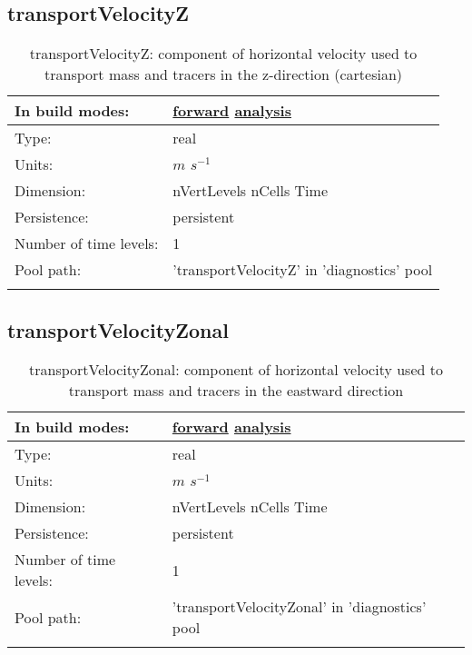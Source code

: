 \subsection[transportVelocityZ]{transportVelocityZ}
\label{subsec:var_sec_diagnostics_transportVelocityZ}
\begin{center}
\begin{longtable}{| p{2.0in} | p{4.0in} |}
        \hline 
        In build modes: & \hyperref[subsec:forward_var_tab_diagnostics]{forward} \hyperref[subsec:analysis_var_tab_diagnostics]{analysis} \\
        \hline 
        Type: & real \\
        \hline 
        Units: & $m$ $s^{-1}$ \\
        \hline 
        Dimension: & nVertLevels nCells Time \\
        \hline 
        Persistence: & persistent \\
        \hline 
        Number of time levels: & 1 \\
        \hline 
            Pool path: & 'transportVelocityZ' in 'diagnostics' pool
 \\
		 \hline 
    \caption{transportVelocityZ: component of horizontal velocity used to transport mass and tracers in the z-direction (cartesian)}
\end{longtable}
\end{center}
\subsection[transportVelocityZonal]{transportVelocityZonal}
\label{subsec:var_sec_diagnostics_transportVelocityZonal}
\begin{center}
\begin{longtable}{| p{2.0in} | p{4.0in} |}
        \hline 
        In build modes: & \hyperref[subsec:forward_var_tab_diagnostics]{forward} \hyperref[subsec:analysis_var_tab_diagnostics]{analysis} \\
        \hline 
        Type: & real \\
        \hline 
        Units: & $m$ $s^{-1}$ \\
        \hline 
        Dimension: & nVertLevels nCells Time \\
        \hline 
        Persistence: & persistent \\
        \hline 
        Number of time levels: & 1 \\
        \hline 
            Pool path: & 'transportVelocityZonal' in 'diagnostics' pool
 \\
		 \hline 
    \caption{transportVelocityZonal: component of horizontal velocity used to transport mass and tracers in the eastward direction}
\end{longtable}
\end{center}
